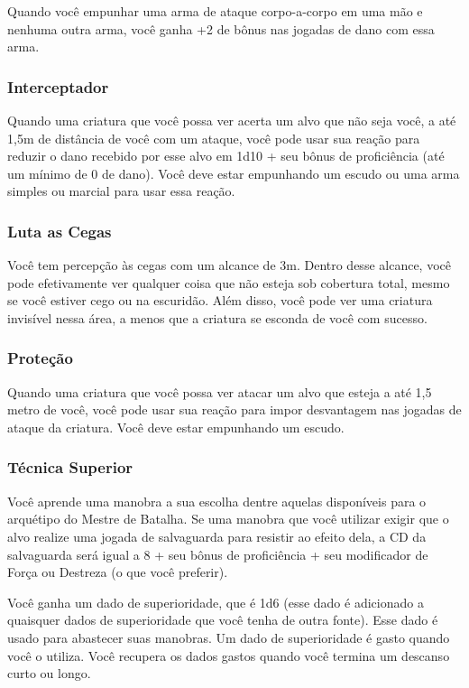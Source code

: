 \documentclass{RPG_Adventure}[2021/10/20]
\begin{document}
\begin{multicols}{2}
Quando você empunhar uma arma de ataque corpo-a-corpo em uma mão e nenhuma outra
arma, você ganha +2 de bônus nas jogadas de dano com essa arma.

\subsubsection{Interceptador}%

Quando uma criatura que você possa ver acerta um alvo que não seja você, a até
1,5m de distância de você com um ataque, você pode usar sua reação para reduzir
o dano recebido por esse alvo em 1d10 + seu bônus de proficiência (até um mínimo
de 0 de dano). Você deve estar empunhando um escudo ou uma arma simples ou
marcial para usar essa reação.

\subsubsection{Luta as Cegas}%

Você tem percepção às cegas com um alcance de 3m. Dentro desse alcance, você
pode efetivamente ver qualquer coisa que não esteja sob cobertura total, mesmo
se você estiver cego ou na escuridão. Além disso, você pode ver uma criatura
invisível nessa área, a menos que a criatura se esconda de você com sucesso.

\subsubsection{Proteção}%

Quando uma criatura que você possa ver atacar um alvo que esteja a até 1,5 metro
de você, você pode usar sua reação para impor desvantagem nas jogadas de ataque
da criatura. Você deve estar empunhando um escudo.

\subsubsection{Técnica Superior}%

Você aprende uma manobra a sua escolha dentre aquelas disponíveis para o
arquétipo do Mestre de Batalha. Se uma manobra que você utilizar exigir que o
alvo realize uma jogada de salvaguarda para resistir ao efeito dela, a CD da
salvaguarda será igual a 8 + seu bônus de proficiência + seu modificador de
Força ou Destreza (o que você preferir).

Você ganha um dado de superioridade, que é 1d6 (esse dado é adicionado a
quaisquer dados de superioridade que você tenha de outra fonte). Esse dado é
usado para abastecer suas manobras. Um dado de superioridade é gasto quando você
o utiliza. Você recupera os dados gastos quando você termina um descanso curto
ou longo.


\end{multicols}
\end{document}
